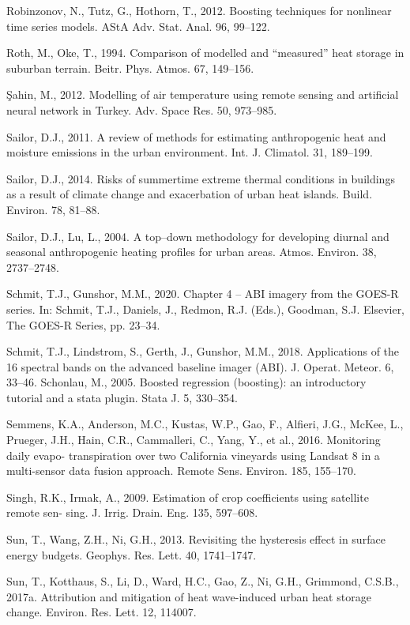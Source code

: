 \documentclass[3p,times]{elsarticle}
\begin{document}
Robinzonov, N., Tutz, G., Hothorn, T., 2012. Boosting techniques for nonlinear time series models. AStA Adv. Stat. Anal. 96, 99–122.

Roth, M., Oke, T., 1994. Comparison of modelled and “measured” heat storage in suburban terrain. Beitr. Phys. Atmos. 67, 149–156.

Şahin, M., 2012. Modelling of air temperature using remote sensing and artificial neural network in Turkey. Adv. Space Res. 50, 973–985.

Sailor, D.J., 2011. A review of methods for estimating anthropogenic heat and moisture emissions in the urban environment. Int. J. Climatol. 31, 189–199.

Sailor, D.J., 2014. Risks of summertime extreme thermal conditions in buildings as a result of climate change and exacerbation of urban heat islands. Build. Environ. 78, 81–88.

Sailor, D.J., Lu, L., 2004. A top–down methodology for developing diurnal and seasonal anthropogenic heating profiles for urban areas. Atmos. Environ. 38, 2737–2748.

Schmit, T.J., Gunshor, M.M., 2020. Chapter 4 – ABI imagery from the GOES-R series. In: Schmit, T.J., Daniels, J., Redmon, R.J. (Eds.), Goodman, S.J. Elsevier, The GOES-R Series, pp. 23–34.

Schmit, T.J., Lindstrom, S., Gerth, J., Gunshor, M.M., 2018. Applications of the 16 spectral bands on the advanced baseline imager (ABI). J. Operat. Meteor. 6, 33–46. Schonlau, M., 2005. Boosted regression (boosting): an introductory tutorial and a stata plugin. Stata J. 5, 330–354.

Semmens, K.A., Anderson, M.C., Kustas, W.P., Gao, F., Alfieri, J.G., McKee, L., Prueger, J.H., Hain, C.R., Cammalleri, C., Yang, Y., et al., 2016. Monitoring daily evapo- transpiration over two California vineyards using Landsat 8 in a multi-sensor data fusion approach. Remote Sens. Environ. 185, 155–170.

Singh, R.K., Irmak, A., 2009. Estimation of crop coefficients using satellite remote sen- sing. J. Irrig. Drain. Eng. 135, 597–608.

Sun, T., Wang, Z.H., Ni, G.H., 2013. Revisiting the hysteresis effect in surface energy budgets. Geophys. Res. Lett. 40, 1741–1747.

Sun, T., Kotthaus, S., Li, D., Ward, H.C., Gao, Z., Ni, G.H., Grimmond, C.S.B., 2017a. Attribution and mitigation of heat wave-induced urban heat storage change. Environ. Res. Lett. 12, 114007.
\end{document}
